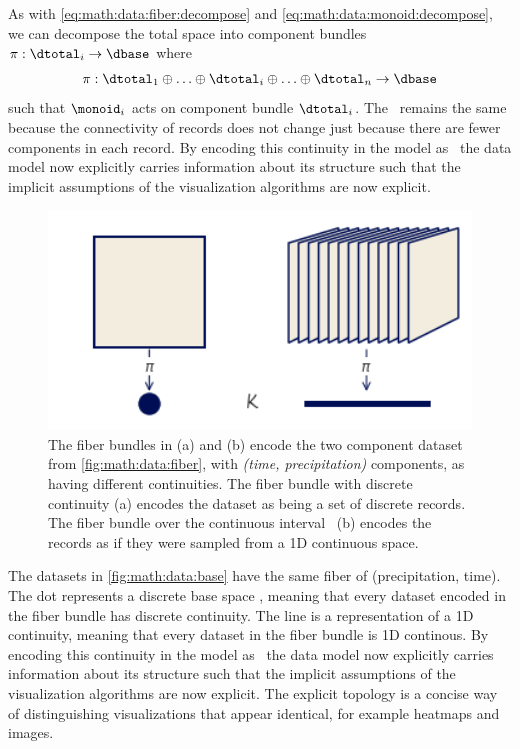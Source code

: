 \documentclass[../main.tex]{subfiles}
\begin{document}
As with \autoref{eq:math:data:fiber:decompose} and \autoref{eq:math:data:monoid:decompose}, we can decompose the total space into component bundles $\pi:\dtotal_i\rightarrow \dbase$ where
\begin{equation}
    \label{eq:math:data:base:decompose}
    \pi:\dtotal_1\oplus\ldots\oplus \dtotal_i \oplus\ldots \oplus \dtotal_n \rightarrow \dbase
\end{equation}
such that \(\monoid_{i}\) acts on component bundle \(\dtotal_i\). The \dbase\ remains the same because the connectivity of records does not change just because there are fewer components in each record. By encoding this continuity in the model as \dbase\, the data model now explicitly carries information about its structure such that the implicit assumptions of the visualization algorithms are now explicit.
\begin{figure}[H]
    \includegraphics[width=1\textwidth]{figures/math/base.png}
    \caption{The fiber bundles in (a) and (b) encode the two component dataset from \autoref{fig:math:data:fiber}, with \textit{(time, precipitation)} components, as having different continuities. The fiber bundle with discrete continuity (a) encodes the dataset as being a set of discrete records. The fiber bundle over the continuous interval \dbase\ (b) encodes the records as if they were sampled from a 1D continuous space.} 
    \label{fig:math:data:base}
\end{figure}

The datasets in \autoref{fig:math:data:base} have the same fiber of (precipitation, time). The dot represents a discrete base space \dbase, meaning that every dataset encoded in the fiber bundle has discrete continuity. The line is a representation of a 1D continuity, meaning that every dataset in the fiber bundle is 1D continous. By encoding this continuity in the model as \dbase\, the data model now explicitly carries information about its structure such that the implicit assumptions of the visualization algorithms are now explicit. The explicit topology is a concise way of distinguishing visualizations that appear identical, for example heatmaps and images.  
 
\end{document}
